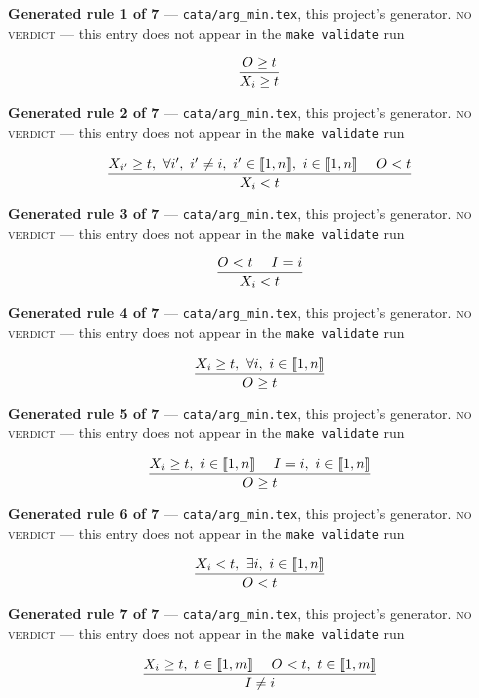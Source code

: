\documentclass[10pt,a4paper]{article}
\newcommand{\rulebox}[1]{%
  \[\resizebox{\ifdim\width>\linewidth\linewidth\else\width\fi}{!}%
    {$\displaystyle #1$}\]}
\begin{document}
{\small\textbf{Generated rule 1 of 7} --- \texttt{cata/arg\_min.tex}, this project's generator. \textsc{no verdict} --- this entry does not appear in the \texttt{make validate} run\par}
\rulebox{\frac{O_{} \geq t}{X_{i} \geq t}}

{\small\textbf{Generated rule 2 of 7} --- \texttt{cata/arg\_min.tex}, this project's generator. \textsc{no verdict} --- this entry does not appear in the \texttt{make validate} run\par}
\rulebox{\frac{X_{i'} \geq t,~\forall i',~i' \neq i,~i' \in \llbracket1,n\rrbracket,~i \in \llbracket1,n\rrbracket~~~~O_{}<t}{X_{i}<t}}

{\small\textbf{Generated rule 3 of 7} --- \texttt{cata/arg\_min.tex}, this project's generator. \textsc{no verdict} --- this entry does not appear in the \texttt{make validate} run\par}
\rulebox{\frac{O_{}<t~~~~I=i}{X_{i}<t}}

{\small\textbf{Generated rule 4 of 7} --- \texttt{cata/arg\_min.tex}, this project's generator. \textsc{no verdict} --- this entry does not appear in the \texttt{make validate} run\par}
\rulebox{\frac{X_{i} \geq t,~\forall i,~i \in \llbracket1,n\rrbracket}{O_{} \geq t}}

{\small\textbf{Generated rule 5 of 7} --- \texttt{cata/arg\_min.tex}, this project's generator. \textsc{no verdict} --- this entry does not appear in the \texttt{make validate} run\par}
\rulebox{\frac{X_{i} \geq t,~i \in \llbracket1,n\rrbracket~~~~I=i,~i \in \llbracket1,n\rrbracket}{O_{} \geq t}}

{\small\textbf{Generated rule 6 of 7} --- \texttt{cata/arg\_min.tex}, this project's generator. \textsc{no verdict} --- this entry does not appear in the \texttt{make validate} run\par}
\rulebox{\frac{X_{i}<t,~\exists i,~i \in \llbracket1,n\rrbracket}{O_{}<t}}

{\small\textbf{Generated rule 7 of 7} --- \texttt{cata/arg\_min.tex}, this project's generator. \textsc{no verdict} --- this entry does not appear in the \texttt{make validate} run\par}
\rulebox{\frac{X_{i} \geq t,~t \in \llbracket1,m\rrbracket~~~~O_{}<t,~t \in \llbracket1,m\rrbracket}{I \neq i}}
\end{document}
